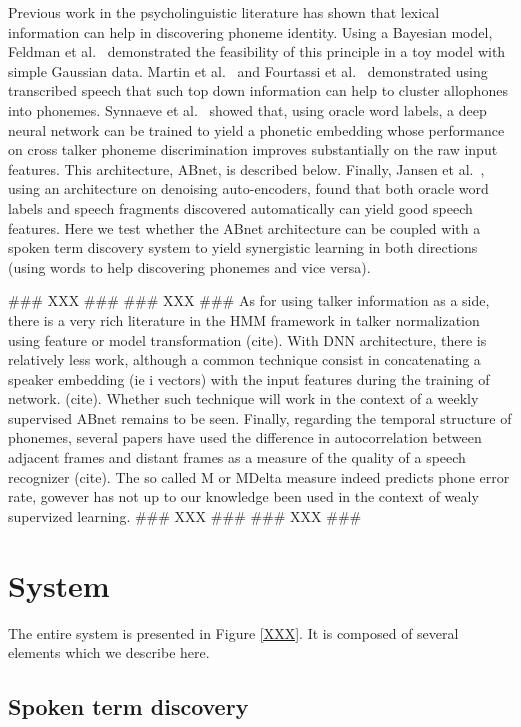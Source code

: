\documentclass[a4paper]{article}
\begin{document}
Previous work in the psycholinguistic literature has shown that lexical information can help in discovering phoneme identity. Using a Bayesian model, Feldman et al.~\cite{XXX} demonstrated the feasibility of this principle in a toy model with simple Gaussian data. Martin et al.~\cite{XXX} and Fourtassi et al.~\cite{XXX} demonstrated using transcribed speech that such top down information can help to cluster allophones into phonemes. Synnaeve et al.~\cite{XXX} showed that, using oracle word labels, a deep neural network can be trained to yield a phonetic embedding whose performance on cross talker phoneme discrimination improves substantially on the raw input features. This architecture, {\sc ABnet}, is described below. Finally, Jansen et al.~\cite{XXX}, using an architecture on denoising auto-encoders, found that both oracle word labels and speech fragments discovered automatically can yield good speech features. Here we test whether the ABnet architecture can be coupled with a spoken term discovery system to yield synergistic learning in both directions (using words to help discovering phonemes and vice versa). 

### XXX ###
### XXX ###
As for using talker information as a side, there is a very rich literature in the HMM framework in talker normalization using feature or model transformation (cite). With DNN architecture, there is relatively less work, although a common technique consist in concatenating a speaker embedding (ie i vectors) with the input features during the training of network. (cite). Whether such technique will work in the context of a weekly supervised ABnet remains to be seen. Finally, regarding the temporal structure of phonemes, several papers have used the difference in autocorrelation between adjacent frames and distant frames as a measure of the quality of a speech recognizer (cite). The so called M or MDelta measure indeed predicts phone error rate, gowever has not up to our knowledge been used in the context of wealy supervized learning.
### XXX ###
### XXX ###

\section{System}
The entire system is presented in Figure \ref{XXX}. It is composed of several elements which we describe here. 

\subsection{Spoken term discovery}
\end{document}
